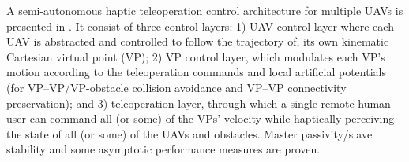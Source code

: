 A semi-autonomous haptic teleoperation control architecture for multiple UAVs is presented in \cite{haptic-teleoperation-uav}. It consist of three control layers: 1) UAV control layer where each UAV is abstracted and controlled to follow the trajectory of, its own kinematic Cartesian virtual point (VP); 2) VP control layer, which modulates each VP’s motion according to the teleoperation commands and local artificial potentials (for VP–VP/VP-obstacle collision avoidance and VP–VP connectivity preservation); and 3) teleoperation layer, through which a single remote human user can command all (or some) of the VPs’ velocity while haptically perceiving the state of all (or some) of the UAVs and obstacles. Master passivity/slave stability and some asymptotic performance measures are proven. 